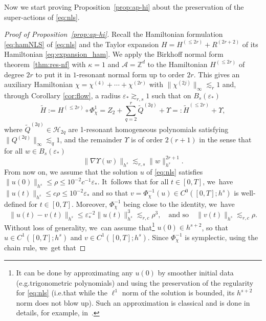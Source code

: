 \documentclass[10pt]{amsart}
\newcommand{\ie}{i.e.}
\newcommand{\eg}{e.g.}
\theoremstyle{plain}
\theoremstyle{definition}
\newcommand{\1}{\mathbf{1}}
\begin{document}
Now we start proving Proposition~\ref{prop:ap-hi} about the preservation of the super-actions of \eqref{eq:nls}.

\begin{proof}[Proof of Proposition~\ref{prop:ap-hi}]
Recall the Hamiltonian formulation \eqref{eq:hamNLS} of \eqref{eq:nls} and the Taylor expansion $H = H^{(\leq 2r)} + R^{(2r+2)}$ of its Hamiltonian \eqref{eq:expansion_ham}. We apply the Birkhoff normal form theorem~\ref{thm:res-nf} with $\kappa=1$ and $\mathcal{A}= \mathbb{Z}^d$ to the Hamiltonian $H^{(\leq 2r)}$ of degree $2r$ to put it in $1$-resonant normal form up to order $2r$. This gives an auxiliary Hamiltonian $\chi = \chi^{(4)} + \cdots + \chi^{(2r)}$ with $\| \chi^{(2j)}\|_\infty \lesssim_r 1$ and, through Corollary \ref{cor:flow}, a radius $\varepsilon_\ast \gtrsim_{r,s} 1$ such that on $B_s(\varepsilon_*)$
\[
\widetilde{H}:=H^{(\leq 2r)}\circ\Phi_\chi^1 =Z_2+ \sum_{q=2}^{r}\widetilde{Q}^{(2q)}+\Upsilon =: \widetilde{H}^{(\leq 2r)} + \Upsilon,
\]
where $\widetilde{Q}^{(2q)} \in \mathcal{H}_{2q}$ are 1-resonant homogeneous polynomials satisfying $\| Q^{(2q)}\|_{\infty} \lesssim_q 1 $, and
the remainder $\Upsilon$ is of order $2(r+1)$ in the sense that for all $w\in B_s(\varepsilon_*)$
\begin{equation}
\label{eq:bientotnoel}
\|\nabla \Upsilon(w)\|_{h^{s}}\lesssim_{r,s} \| w\|_{h^s}^{2r+1}.
\end{equation}
From now on, we assume that the solution $u$ of \eqref{eq:nls} satisfies \hbox{$\| u(0) \|_{h^s} \!\!\leq\! \rho \!\leq\! 10^{-2}\! c^{-1}\!\varepsilon_\ast$}. It~follows that for all $t\in [0,T]$, we~have $\|u(t) \|_{h^s} \leq c \rho\leq 10^{-2} \varepsilon_\ast$ and so that $v = \Phi_\chi^{-1}(u) \in C^0([0,T];h^s)$ is well-defined for $t\in [0,T]$. Moreover, $ \Phi_\chi^{-1}$ being close to the identity, we~have
\begin{equation}
\label{eq:pr-var}
\|u(t)-v(t)\|_{h^{s}}\leq \varepsilon_{\ast}^{-2}\|u(t)\|_{h^{s}}^{3} \lesssim_{r,c} \rho^3,\quad \text{and \ so}\quad \|v(t)\|_{h^{s}}\lesssim_{r,c} \rho.
\end{equation}
Without loss of generality, we~can assume that\footnote{It can be done by approximating any $u(0)$ by smoother initial data (\eg trigonometric polynomials) and using the preservation of the regularity for \eqref{eq:nls} (\ie that while the $\ell^1$ norm of the solution is bounded, its $h^{s+2}$ norm does not blow up). Such an approximation is classical and is done in details, for example, in~\cite{BG22}.} $u(0) \in h^{s+2}$, so that $u\in C^1([0,T];h^s)$ and $v \in C^1([0,T];h^s)$. Since $\Phi_\chi^{-1}$ is symplectic, using the chain rule, we~get that

\end{proof}
\end{document}

